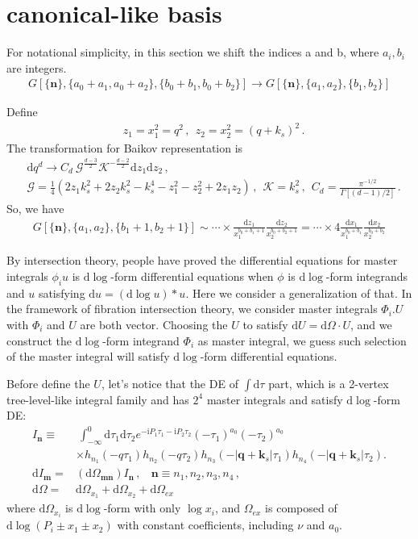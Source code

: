 \documentclass[a4paper,12pt]{article}
\newcommand{\n}{\nonumber}
\def\di{{\mathrm{d}}}
\def\ii{\mathrm{i}}
\newcommand{\mG}{\mathcal{G}}
\newcommand{\mK}{\mathcal{K}}
\def\to{\rightarrow}
\begin{document}
\section{canonical-like basis}

For notational simplicity, in this section we shift the indices 
a and b, where $a_i, b_i$ are integers.
\begin{align}
G[\{\bm{n}\},\{a_0+a_1,a_0+a_2\},\{b_0+b_1,b_0+b_2\}] \to G[\{\bm{n}\},\{a_1,a_2\},\{b_1,b_2\}]
\end{align}

Define
\begin{align}
&z_1=x_1^2=q^2  \,, ~~ z_2=x_2^2=(q+k_s)^2  \,.
\end{align}
The transformation for Baikov representation is 
\begin{align}
&\di q^d \to C_{d } ~  \mG^{\frac{d-3}{2}}\mK^{-\frac{d-2}{2} } \di z_1 \di z_2 \, ,  \n\\
&\mG=\frac{1}{4} \left(2 z_1 k_s^2+2 z_2 k_s^2-k_s^4-z_1^2-z_2^2+2 z_1 z_2\right)\,,~~ \mK=k_s^2 \,, ~~C_{d} = \frac{ \pi^{ - 1 / 2}}{ \Gamma[(d - 1)/2]}  \,.
\end{align}
So, we have 
\begin{align}
G[\{\bm{n}\},\{a_1,a_2\},\{b_1+1,b_2+1\}]\sim \cdots \times \frac{\di z_1}{x_1^{b_0+b_1+1}}\frac{\di z_2}{x_2^{b_0+b_2+1}} = \cdots \times 4\frac{\di x_1}{x_1^{b_0+b_1}}\frac{\di x_2}{x_2^{b_0+b_2}}
\end{align}


By intersection theory, people have proved the differential equations for master integrals $\phi_i u$  is $\di \log$-form differential equations when $\phi$ is $\di \log$-form integrands  and $u$ satisfying $ \di u = (\di \log  u) * u $.  
Here we consider a generalization of that. In the framework of fibration intersection theory, 
we consider master integrals $\Phi_i . U$ with $\Phi_i$ and $U$ are both vector. Choosing the $U$ to satisfy \( \di U = \di \Omega \cdot U \), 
and we construct the $\di \log$-form integrand $\Phi_i$ as master integral, we guess such selection of the master integral will satisfy $\di \log$-form differential equations.

Before define the $U$, let's notice that the DE of $\int \di \tau$ part, which is a 2-vertex tree-level-like integral family and has $2^4$ master integrals and satisfy $\di \log$-form DE:
\begin{align}
I_{\bm{n}} \equiv&~ \int_{-\infty}^0 \di\tau_1\di\tau_2 e^{-\ii P_1\tau_1 - \ii P_2\tau_2}(-\tau_1)^{a_0}(-\tau_2)^{a_0} \n\\
&\times h_{n_1}(-q\tau_1)h_{n_2}(-q\tau_2)h_{n_3}(-|\bm q+\bm k_s|\tau_1)h_{n_4}(-|\bm q+\bm k_s|\tau_2). \n\\
\di I_{\bm{m}} =& (\di \Omega_{ \bm{m}\bm{n} } ) I_{\bm{n}}   \, ,~~~~\bm{n}\equiv n_1,n_2,n_3,n_4  \,, \n\\
 \di \Omega=&\di \Omega_{x_1}+\di \Omega_{x_2}+\di \Omega_{ex}
\end{align}
where $\di \Omega_{x_i}$ is $\di \log$-form with only $\log x_i$, and  $\Omega_{ex}$ is composed of  $\di \log (P_i\pm x_1 \pm x_2)$ with constant coefficients, including $\nu$ and $a_0$.
\end{document}

